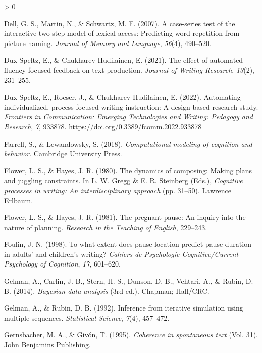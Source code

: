 \documentclass[
  english,
  man,floatsintext]{apa7}
\newlength{\cslhangindent}
\newenvironment{CSLReferences}[2] %
 {%
  \setlength{\parindent}{0pt}
  \ifodd #1 \everypar{\setlength{\hangindent}{\cslhangindent}}\ignorespaces\fi
  \ifnum #2 > 0
  \setlength{\parskip}{#2\baselineskip}
  \fi
 }%
 {}
\begin{document}
\begin{CSLReferences}{1}{0}
\leavevmode\hypertarget{ref-dell2007case}{}%
Dell, G. S., Martin, N., \& Schwartz, M. F. (2007). A case-series test of the interactive two-step model of lexical access: Predicting word repetition from picture naming. \emph{Journal of Memory and Language}, \emph{56}(4), 490--520.

\leavevmode\hypertarget{ref-dux2021effect}{}%
Dux Speltz, E., \& Chukharev-Hudilainen, E. (2021). The effect of automated fluency-focused feedback on text production. \emph{Journal of Writing Research}, \emph{13}(2), 231--255.

\leavevmode\hypertarget{ref-dux2022automating}{}%
Dux Speltz, E., Roeser, J., \& Chukharev-Hudilainen, E. (2022). Automating individualized, process-focused writing instruction: A design-based research study. \emph{Frontiers in Communication: Emerging Technologies and Writing: Pedagogy and Research}, \emph{7}, 933878. \url{https://doi.org/0.3389/fcomm.2022.933878}

\leavevmode\hypertarget{ref-farrell2018computational}{}%
Farrell, S., \& Lewandowsky, S. (2018). \emph{Computational modeling of cognition and behavior}. Cambridge University Press.

\leavevmode\hypertarget{ref-flower1980ynamics}{}%
Flower, L. S., \& Hayes, J. R. (1980). The dynamics of composing: Making plans and juggling constraints. In L. W. Gregg \& E. R. Steinberg (Eds.), \emph{Cognitive processes in writing: An interdisciplinary approach} (pp. 31--50). Lawrence Erlbaum.

\leavevmode\hypertarget{ref-flower1981pregnant}{}%
Flower, L. S., \& Hayes, J. R. (1981). The pregnant pause: An inquiry into the nature of planning. \emph{Research in the Teaching of English}, 229--243.

\leavevmode\hypertarget{ref-foulin1998extent}{}%
Foulin, J.-N. (1998). To what extent does pause location predict pause duration in adults' and children's writing? \emph{Cahiers de Psychologie Cognitive/Current Psychology of Cognition}, \emph{17}, 601--620.

\leavevmode\hypertarget{ref-gelman2014}{}%
Gelman, A., Carlin, J. B., Stern, H. S., Dunson, D. B., Vehtari, A., \& Rubin, D. B. (2014). \emph{Bayesian data analysis} (3rd ed.). Chapman; Hall/CRC.

\leavevmode\hypertarget{ref-gelman1992}{}%
Gelman, A., \& Rubin, D. B. (1992). Inference from iterative simulation using multiple sequences. \emph{Statistical Science}, \emph{7}(4), 457--472.

\leavevmode\hypertarget{ref-gernsbacher1995coherence}{}%
Gernsbacher, M. A., \& Givón, T. (1995). \emph{Coherence in spontaneous text} (Vol. 31). John Benjamins Publishing.


\end{CSLReferences}
\end{document}
